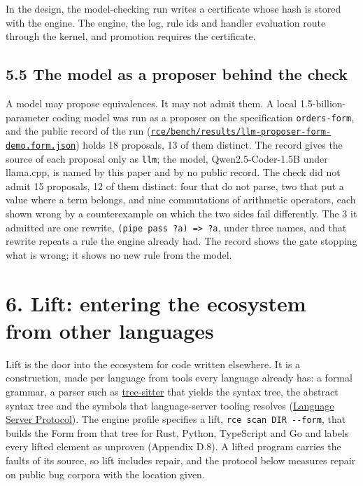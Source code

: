 \documentclass[10pt,letterpaper]{article}
\begin{document}
In the design, the model-checking run writes a certificate whose hash is
stored with the engine. The engine, the log, rule ids and handler
evaluation route through the kernel, and promotion requires the
certificate.

\subsection{5.5 The model as a proposer behind the
check}\label{the-model-as-a-proposer-behind-the-check}

A model may propose equivalences. It may not admit them. A local
1.5-billion-parameter coding model was run as a proposer on the
specification \texttt{orders-form}, and the public record of the run
(\href{https://github.com/openIE-dev/openie-research-experiments/blob/main/rce/bench/results/llm-proposer-form-demo.form.json}{\texttt{rce/\allowbreak{}bench/\allowbreak{}results/\allowbreak{}llm-\allowbreak{}proposer-\allowbreak{}form-\allowbreak{}demo.\allowbreak{}form.\allowbreak{}json}})
holds 18 proposals, 13 of them distinct. The record gives the source of
each proposal only as \texttt{llm}; the model, Qwen2.5-Coder-1.5B under
llama.cpp, is named by this paper and by no public record. The check did
not admit 15 proposals, 12 of them distinct: four that do not parse, two
that put a value where a term belongs, and nine commutations of
arithmetic operators, each shown wrong by a counterexample on which the
two sides fail differently. The 3 it admitted are one rewrite,
\texttt{(pipe\ pass\ ?a)\ =\textgreater{}\ ?a}, under three names, and
that rewrite repeats a rule the engine already had. The record shows the
gate stopping what is wrong; it shows no new rule from the model.

\section{6. Lift: entering the ecosystem from other
languages}\label{lift-entering-the-ecosystem-from-other-languages}

Lift is the door into the ecosystem for code written elsewhere. It is a
construction, made per language from tools every language already has: a
formal grammar, a parser such as
\href{https://tree-sitter.github.io/tree-sitter/}{tree-sitter} that
yields the syntax tree, the abstract syntax tree and the symbols that
language-server tooling resolves
(\href{https://microsoft.github.io/language-server-protocol/}{Language
Server Protocol}). The engine profile specifies a lift,
\texttt{rce\ scan\ DIR\ -\allowbreak{}\/\allowbreak{}-\allowbreak{}form}, that builds the Form from that tree
for Rust, Python, TypeScript and Go and labels every lifted element as
unproven (Appendix D.8). A lifted program carries the faults of its
source, so lift includes repair, and the protocol below measures repair
on public bug corpora with the location given.
\end{document}
